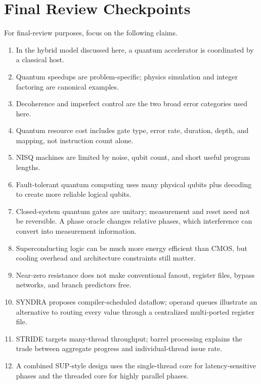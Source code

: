 \section{Final Review Checkpoints}\label{sec:appd-review}
For final-review purposes, focus on the following claims.
\begin{enumerate}
    \item In the hybrid model discussed here, a quantum accelerator is coordinated by a classical host.
    \item Quantum speedups are problem-specific; physics simulation and integer factoring are canonical examples.
    \item Decoherence and imperfect control are the two broad error categories used here.
    \item Quantum resource cost includes gate type, error rate, duration, depth, and mapping, not instruction count alone.
    \item NISQ machines are limited by noise, qubit count, and short useful program lengths.
    \item Fault-tolerant quantum computing uses many physical qubits plus decoding to create more reliable logical qubits.
    \item Closed-system quantum gates are unitary; measurement and reset need not be reversible. A phase oracle changes relative phases, which interference can convert into measurement information.
    \item Superconducting logic can be much more energy efficient than CMOS, but cooling overhead and architecture constraints still matter.
    \item Near-zero resistance does not make conventional fanout, register files, bypass networks, and branch predictors free.
    \item SYNDRA proposes compiler-scheduled dataflow; operand queues illustrate an alternative to routing every value through a centralized multi-ported register file.
    \item STRIDE targets many-thread throughput; barrel processing explains the trade between aggregate progress and individual-thread issue rate.
    \item A combined SUP-style design uses the single-thread core for latency-sensitive phases and the threaded core for highly parallel phases.
\end{enumerate}


